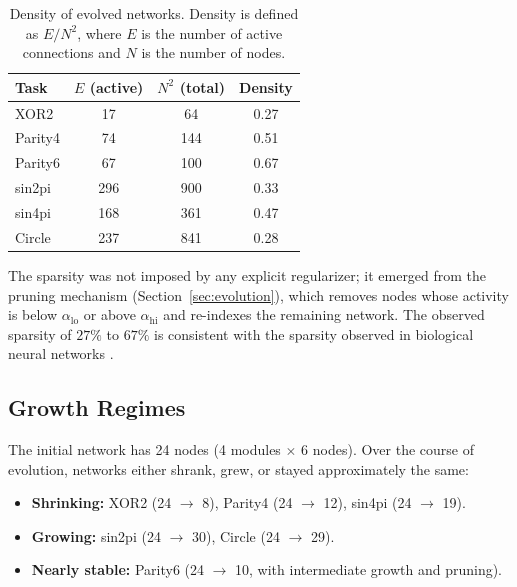 \begin{table}[h]
  \centering
  \small
  \caption{Density of evolved networks. Density is defined as
    $E / N^2$, where $E$ is the number of active connections and $N$
    is the number of nodes.}
  \label{tab:density}
  \begin{tabular}{lccc}
    \toprule
    \textbf{Task} & $E$ \textbf{(active)} & $N^2$ \textbf{(total)}
      & \textbf{Density} \\
    \midrule
    XOR2      &  17 &  64 & 0.27 \\
    Parity4   &  74 & 144 & 0.51 \\
    Parity6   &  67 & 100 & 0.67 \\
    sin2pi    & 296 & 900 & 0.33 \\
    sin4pi    & 168 & 361 & 0.47 \\
    Circle    & 237 & 841 & 0.28 \\
    \bottomrule
  \end{tabular}
\end{table}

The sparsity was not imposed by any explicit regularizer; it emerged
from the pruning mechanism (Section~\ref{sec:evolution}), which
removes nodes whose activity is below $\alpha_{\text{lo}}$ or above
$\alpha_{\text{hi}}$ and re-indexes the remaining network. The
observed sparsity of $27\%$ to $67\%$ is consistent with the
sparsity observed in biological neural networks
\citep{chklovskii2004wiring, cherniak1994component}.

\subsection{Growth Regimes}
\label{sec:results-growth}

The initial network has 24 nodes (4 modules $\times$ 6 nodes). Over
the course of evolution, networks either shrank, grew, or stayed
approximately the same:

\begin{itemize}
  \item \textbf{Shrinking:} XOR2 (24 $\to$ 8), Parity4 (24 $\to$ 12),
    sin4pi (24 $\to$ 19).
  \item \textbf{Growing:} sin2pi (24 $\to$ 30), Circle (24 $\to$ 29).
  \item \textbf{Nearly stable:} Parity6 (24 $\to$ 10, with intermediate
    growth and pruning).
\end{itemize}


